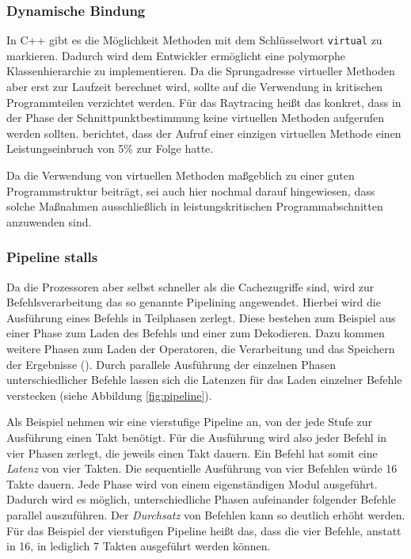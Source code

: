 \subsubsection{Dynamische Bindung}

In C++ gibt es die Möglichkeit Methoden mit dem Schlüsselwort \verb|virtual| zu markieren. Dadurch wird dem Entwickler ermöglicht eine polymorphe Klassenhierarchie zu implementieren. 
Da die Sprungadresse virtueller Methoden aber erst zur Laufzeit berechnet wird, sollte auf die Verwendung in kritischen Programmteilen verzichtet werden. Für das Raytracing heißt das konkret, dass in der Phase der Schnittpunktbestimmung keine virtuellen Methoden aufgerufen werden sollten. \cite{Wald04} berichtet, dass der Aufruf einer einzigen virtuellen Methode einen Leistungseinbruch von 5\% zur Folge hatte.

Da die Verwendung von virtuellen Methoden maßgeblich zu einer guten Programmstruktur beiträgt, sei auch hier nochmal darauf hingewiesen, dass solche Maßnahmen ausschließlich in leistungskritischen Programmabschnitten anzuwenden sind.


\subsubsection{Pipeline stalls}
\label{sec:branch}

Da die Prozessoren aber selbst schneller als die Cachezugriffe sind, wird zur Befehlsverarbeitung das so genannte Pipelining angewendet. Hierbei wird die Ausführung eines Befehls in Teilphasen zerlegt. Diese bestehen zum Beispiel aus einer Phase zum Laden des Befehls und einer zum Dekodieren. Dazu kommen weitere Phasen zum Laden der Operatoren, die Verarbeitung und das Speichern der Ergebnisse (\cite{RechPom}). Durch parallele Ausführung der einzelnen Phasen unterschiedlicher Befehle lassen sich die Latenzen für das Laden einzelner Befehle verstecken (siehe Abbildung \ref{fig:pipeline}).

Als Beispiel nehmen wir eine vierstufige Pipeline an, von der jede Stufe zur Ausführung einen Takt benötigt. Für die Ausführung wird also jeder Befehl in vier Phasen zerlegt, die jeweils einen Takt dauern. Ein Befehl hat somit eine \textit{Latenz} von vier Takten. Die sequentielle Ausführung von vier Befehlen würde 16 Takte dauern. Jede Phase wird von einem eigenständigen Modul ausgeführt.
Dadurch wird es möglich, unterschiedliche Phasen aufeinander folgender Befehle parallel auszuführen. Der \textit{Durchsatz} von Befehlen kann so deutlich erhöht werden. Für das Beispiel der vierstufigen Pipeline heißt das, dass die vier Befehle, anstatt in 16, in lediglich 7 Takten ausgeführt werden können.

